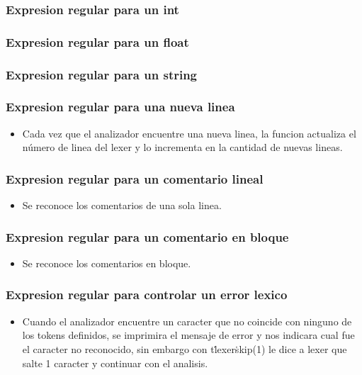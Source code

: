 \documentclass{article}
\begin{document}
\subsubsection{Expresion regular para un int}

\subsubsection{Expresion regular para un float}

\subsubsection{Expresion regular para un string}

\subsubsection{Expresion regular para una nueva linea}
\begin{itemize}
    \item Cada vez que el analizador encuentre una nueva linea, la funcion actualiza el número de linea del lexer y lo incrementa en la cantidad de nuevas lineas.
\end{itemize}

\subsubsection{Expresion regular para un comentario lineal}
\begin{itemize}
    \item Se reconoce los comentarios de una sola linea.
\end{itemize}

\subsubsection{Expresion regular para un comentario en bloque}
\begin{itemize}
    \item Se reconoce los comentarios en bloque.
\end{itemize}

\subsubsection{Expresion regular para controlar un error lexico}
\begin{itemize}
    \item Cuando el analizador encuentre un caracter que no coincide con ninguno de los tokens definidos, se imprimira el mensaje de error y nos indicara cual fue el caracter no reconocido, sin embargo con t\.lexer\.skip(1) le dice a lexer que salte 1 caracter y continuar con el analisis.
\end{itemize}

\end{document}
